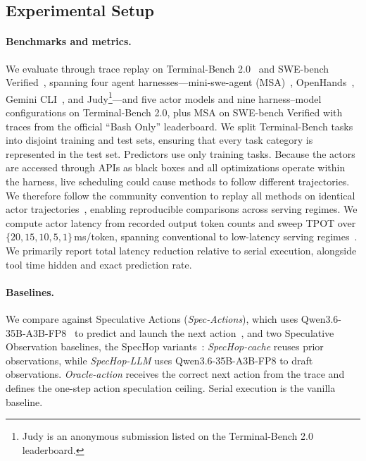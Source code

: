 \subsection{Experimental Setup}

\paragraph{Benchmarks and metrics.}
We evaluate \sysname{} through trace replay on Terminal-Bench
2.0~\citep{terminalbench2} and SWE-bench Verified~\citep{jimenez2024swebench},
spanning four agent harnesses---mini-swe-agent (MSA)~\citep{yang2024sweagent},
OpenHands~\citep{wang2025openhands}, Gemini CLI~\citep{geminicli2025}, and
Judy\footnote{Judy is an anonymous submission listed on the Terminal-Bench 2.0
leaderboard.}---and five actor models and nine harness--model configurations on
Terminal-Bench 2.0, plus MSA on SWE-bench Verified with traces from the
official ``Bash Only'' leaderboard.
We split Terminal-Bench tasks into disjoint training and test sets, ensuring
that every task category is represented in the test set. Predictors use only
training tasks.
Because the actors are accessed through APIs as black boxes
and all optimizations operate within the harness, live scheduling could cause methods to follow different trajectories.
We therefore follow the community convention to replay all methods on identical actor trajectories~\citep{xia2026idleness}, enabling reproducible comparisons across serving regimes.
We compute actor latency from recorded output token counts and sweep TPOT over
$\{20,15,10,5,1\}$\,ms/token, spanning conventional to low-latency serving
regimes~\citep{artificialanalysis_anthropic, artificialanalysis_openai, groq2024specdec, cerebras2025k2think}.
We primarily report total latency reduction relative to serial execution, alongside tool time hidden and exact prediction rate.

\paragraph{Baselines.}
We compare against Speculative Actions (\emph{Spec-Actions}), which uses
Qwen3.6-35B-A3B-FP8~\citep{qwen36_35b_a3b} to predict and launch the next
action~\citep{ye2025speculative}, and two Speculative Observation baselines, the SpecHop variants~\citep{saberi2026spechop}:
\emph{SpecHop-cache} reuses prior observations, while \emph{SpecHop-LLM} uses
Qwen3.6-35B-A3B-FP8 to draft observations. 
\emph{Oracle-action} receives the correct next action from the trace and defines the one-step action speculation ceiling. 
Serial execution is the vanilla baseline.

